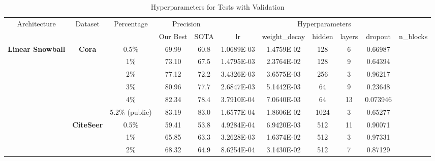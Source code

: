 \begin{table}[htbp]
\setlength{\tabcolsep}{1.5pt}
  \centering
  \caption{Hyperparameters for Tests with Validation}
  \scriptsize
    \begin{tabular}{ccccc|cccccc}
    \toprule
    \toprule
    \multirow{2}[1]{*}{Architecture} & \multirow{2}[1]{*}{Dataset} & \multirow{2}[1]{*}{Percentage} & \multicolumn{2}{c|}{Precision} & \multicolumn{6}{c}{Hyperparameters} \\
          &       &       & Our Best & SOTA  & lr    & weight\_decay & hidden & layers & dropout & n\_blocks \\
    \midrule
    \multirow{15}[2]{*}{\textbf{Linear Snowball}} & \multirow{6}[1]{*}{\textbf{Cora}} & 0.5\% & \cellcolor[rgb]{ .388,  .745,  .482}69.99 & \cellcolor[rgb]{ .973,  .412,  .42}60.8 & 1.0689E-03 & 1.4759E-02 & 128   & 6     & 0.66987 & ~ \\
          &       & 1\%   & \cellcolor[rgb]{ .388,  .745,  .482}73.10 & \cellcolor[rgb]{ .973,  .412,  .42}67.5 & 1.4795E-03 & 2.3764E-02 & 128   & 9     & 0.64394 & ~ \\
          &       & 2\%   & \cellcolor[rgb]{ .388,  .745,  .482}77.12 & \cellcolor[rgb]{ .973,  .412,  .42}72.2 & 3.4326E-03 & 3.6575E-03 & 256   & 3     & 0.96217 & ~ \\
          &       & 3\%   & \cellcolor[rgb]{ .388,  .745,  .482}80.96 & \cellcolor[rgb]{ .973,  .412,  .42}77.7 & 2.6847E-03 & 5.1442E-03 & 64    & 9     & 0.23648 & ~ \\
          &       & 4\%   & \cellcolor[rgb]{ .388,  .745,  .482}82.34 & \cellcolor[rgb]{ .973,  .412,  .42}78.4 & 3.7910E-04 & 7.0640E-03 & 64    & 13    & 0.073946 & ~ \\
          &       & 5.2\% (public) & \cellcolor[rgb]{ .388,  .745,  .482}83.19 & \cellcolor[rgb]{ .973,  .412,  .42}83.0 & 1.6577E-04 & 1.8606E-02 & 1024  & 3     & 0.65277 & ~ \\
          & \multirow{5}[0]{*}{\textbf{CiteSeer}} & 0.5\% & \cellcolor[rgb]{ .388,  .745,  .482}59.41 & \cellcolor[rgb]{ .973,  .412,  .42}53.8 & 4.9284E-04 & 6.9420E-03 & 512   & 11    & 0.90071 & ~ \\
          &       & 1\%   & \cellcolor[rgb]{ .388,  .745,  .482}65.85 & \cellcolor[rgb]{ .973,  .412,  .42}63.3 & 3.2628E-03 & 1.6374E-02 & 512   & 3     & 0.97331 & ~ \\
          &       & 2\%   & \cellcolor[rgb]{ .388,  .745,  .482}68.32 & \cellcolor[rgb]{ .973,  .412,  .42}64.9 & 8.6254E-04 & 3.1430E-02 & 512   & 7     & 0.87129 & ~ \\

\end{tabular}
\end{table}
